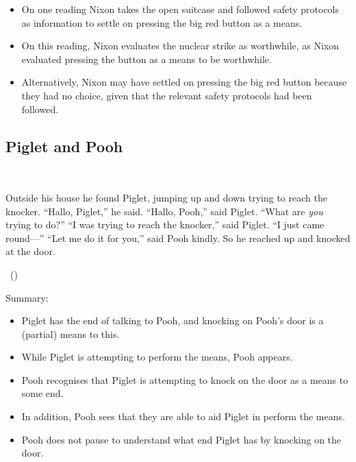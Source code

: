 \documentclass[10pt]{article}
\newcommand{\hozlinedash}[0]{%
  \noindent\hdashrule[0.5ex][c]{\textwidth}{.1pt}{2.5pt}
}
\begin{document}
\hozlinedash

\begin{itemize}[noitemsep]
\item On one reading Nixon takes the open suitcase and followed safety protocols as information to settle on pressing the big red button as a means.
\item On this reading, Nixon evaluates the nuclear strike as worthwhile, as Nixon evaluated pressing the button as a means to be worthwhile.
\item Alternatively, Nixon may have settled on pressing the big red button because they had no choice, given that the relevant safety protocols had been followed.
\end{itemize}

\subsection{Piglet and Pooh}
\label{sec:piglet-pooh}


\begin{scenario}\mbox{ }

  \noindent Outside his house he found Piglet, jumping up and down trying to reach the knocker.\newline
  ``Hallo, Piglet,'' he said.\newline
  ``Hallo, Pooh,'' said Piglet.\newline
  ``What are \emph{you} trying to do?''\newline
  ``I was trying to reach the knocker,'' said Piglet.
  ``I just came round---''\newline
  ``Let me do it for you,'' said Pooh kindly.
  So he reached up and knocked at the door.

  \mbox{ }\hfill\mbox{(\cite[77--78]{Milne:2009aa})}
\end{scenario}

\begin{center}
\end{center}

\hozlinedash

Summary:
\begin{itemize}[noitemsep]
\item Piglet has the end of talking to Pooh, and knocking on Pooh's door is a (partial) means to this.
\item While Piglet is attempting to perform the means, Pooh appears.
\item Pooh recognises that Piglet is attempting to knock on the door as a means to some end.
\item In addition, Pooh sees that they are able to aid Piglet in perform the means.
\item Pooh does not pause to understand what end Piglet has by knocking on the door.
\end{itemize}
\end{document}
